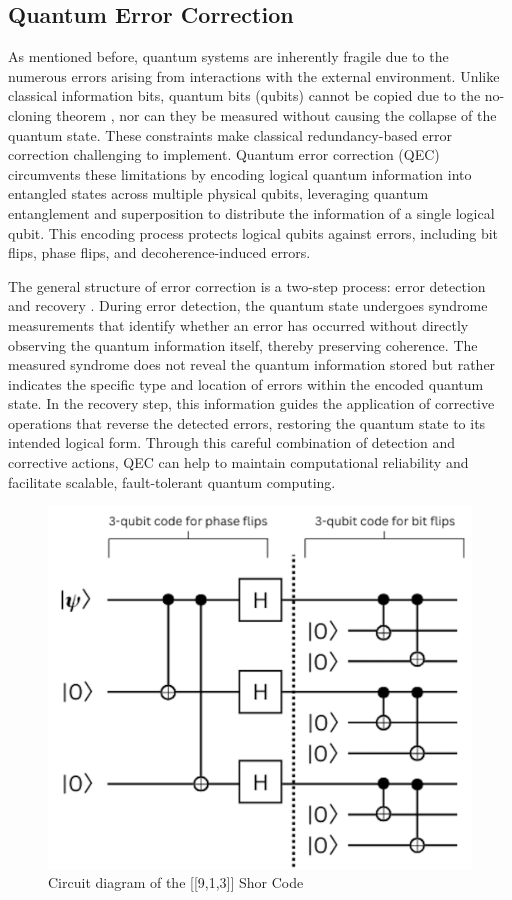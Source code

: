 \subsection{Quantum Error Correction}
As mentioned before, quantum systems are inherently fragile due to the numerous errors arising from interactions with the external environment. Unlike classical information bits, quantum bits (qubits) cannot be copied due to the no-cloning theorem \cite{Wootters1982ASQ}, nor can they be measured without causing the collapse of the quantum state. These constraints make classical redundancy-based error correction challenging to implement. Quantum error correction (QEC) circumvents these limitations by encoding logical quantum information into entangled states across multiple physical qubits, leveraging quantum entanglement and superposition to distribute the information of a single logical qubit. This encoding process protects logical qubits against errors, including bit flips, phase flips, and decoherence-induced errors.

The general structure of error correction is a two-step process: error detection and recovery \cite{cdi_askewsholts_vlebooks_9780511985249}. During error detection, the quantum state undergoes syndrome measurements that identify whether an error has occurred without directly observing the quantum information itself, thereby preserving coherence. The measured syndrome does not reveal the quantum information stored but rather indicates the specific type and location of errors within the encoded quantum state. In the recovery step, this information guides the application of corrective operations that reverse the detected errors, restoring the quantum state to its intended logical form. Through this careful combination of detection and corrective actions, QEC can help to maintain computational reliability and facilitate scalable, fault-tolerant quantum computing.

\begin{figure}[h]
    \centering
    \includegraphics[width=0.5\linewidth]{Logos/Screenshot 2025-03-26 at 21.37.08.png}
    \caption{Circuit diagram of the [[9,1,3]] Shor Code}
    \label{fig:Shor Code Circuit}
\end{figure}

